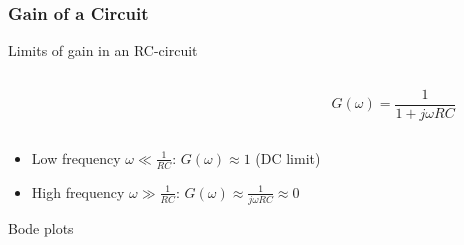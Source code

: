 \documentclass[beamer]{standalone}
\begin{document}
\begin{frame}
 \frametitle{Gain of a Circuit}
 \begin{block}{Limits of gain in an RC-circuit}
  \begin{columns}
   \begin{column}{0.0\textwidth}
   \end{column}
   \begin{column}{0.5\textwidth}
   \end{column}
   \begin{column}{0.5\textwidth}
    \begin{equation*}
     G(\omega) = \frac{1}{1 + j\omega R C}
    \end{equation*}
   \end{column}
  \end{columns}
  \begin{itemize}
   \item Low frequency $\omega \ll \frac{1}{RC}$: $G(\omega) \approx 1$ (DC limit)
   \item High frequency $\omega \gg \frac{1}{RC}$: $G(\omega) \approx \frac{1}{j\omega R C} \approx 0$
  \end{itemize}
 \end{block}
 \begin{block}{Bode plots}
  \begin{center}
  \end{center}
 \end{block}
\end{frame}
\end{document}
